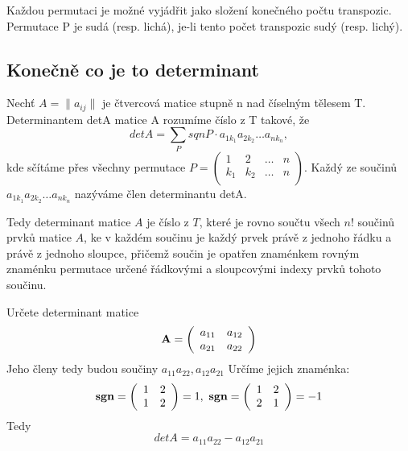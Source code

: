 \begin{sentence}
	Každou permutaci je možné vyjádřit jako složení konečného počtu transpozic. Permutace P je sudá (resp. lichá), je-li tento počet transpozic sudý (resp. lichý).
\end{sentence}

\subsection{Konečně co je to determinant}
\begin{definition}
	Nechť $A = \| a_{ij} \|$ je čtvercová matice stupně n nad číselným tělesem T. Determinantem detA matice A rozumíme číslo z T takové, že $$detA =  \sum_P sqnP \cdot a_{1k_1}a_{2k_2} \dots a_{nk_n},$$ kde sčítáme přes všechny permutace $P = \left( \begin{array}{cccc} 1 & 2 & \dots & n\\ k_1 & k_2 & \dots & n \\ \end{array} \right)$. Každý ze součinů \\$a_{1k_1}a_{2k_2} \dots a_{nk_n}$ nazýváme člen determinantu detA.
\end{definition}
Tedy determinant matice $A$ je číslo z $T$, které je rovno součtu všech $n!$ součinů prvků matice $A$, ke v každém součinu je každý prvek právě z jednoho řádku a právě z jednoho sloupce, přičemž součin je opatřen znaménkem rovným znaménku permutace určené řádkovými a sloupcovými indexy prvků tohoto součinu.

\begin{example}
	Určete determinant matice
	\begin{displaymath}
{\bf A} =
\left( \begin{array}{cc}
a_{11} & a_{12}  \\
a_{21} & a_{22}  \\
\end{array} \right)
\end{displaymath}
Jeho členy tedy budou součiny $a_{11}a_{22}, a_{12}a_{21}$ Určíme jejich znaménka:
	\begin{displaymath}
{\bf sgn} =
\left( \begin{array}{cc} 1 & 2  \\ 1 & 2  \\ \end{array} \right) = 1,\
{\bf sgn} = \left( \begin{array}{cc} 1 & 2  \\ 2 & 1 \\ \end{array} \right) = -1
\end{displaymath}
Tedy $$detA = a_{11}a_{22} - a_{12}a_{21}$$
\end{example}

